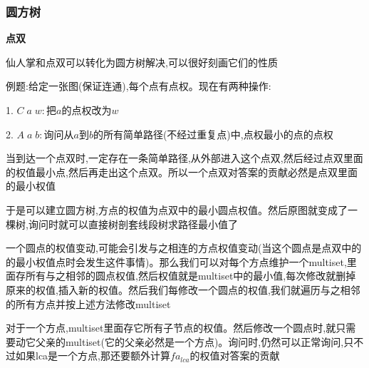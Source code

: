 \documentclass[a4paper]{ctexart}
\begin{document}
\subsubsection{圆方树}

\textbf{点双}

仙人掌和点双可以转化为圆方树解决,可以很好刻画它们的性质

例题:给定一张图(保证连通),每个点有点权。现在有两种操作:

1. $C\;a\;w:$把$a$的点权改为$w$

2. $A\;a\;b:$询问从$a$到$b$的所有简单路径(不经过重复点)中,点权最小的点的点权

当到达一个点双时,一定存在一条简单路径,从外部进入这个点双,然后经过点双里面的权值最小点,然后再走出这个点双。所以一个点双对答案的贡献必然是点双里面的最小权值

于是可以建立圆方树,方点的权值为点双中的最小圆点权值。然后原图就变成了一棵树,询问时就可以直接树剖套线段树求路径最小值了

一个圆点的权值变动,可能会引发与之相连的方点权值变动(当这个圆点是点双中的的最小权值点时会发生这件事情)。那么我们可以对每个方点维护一个multiset,里面存所有与之相邻的圆点权值,然后权值就是multiset中的最小值,每次修改就删掉原来的权值,插入新的权值。然后我们每修改一个圆点的权值,我们就遍历与之相邻的所有方点并按上述方法修改multiset

对于一个方点,multiset里面存它所有子节点的权值。然后修改一个圆点时,就只需要动它父亲的multiset(它的父亲必然是一个方点)。询问时,仍然可以正常询问,只不过如果lca是一个方点,那还要额外计算$fa_{lca}$的权值对答案的贡献
\end{document}
